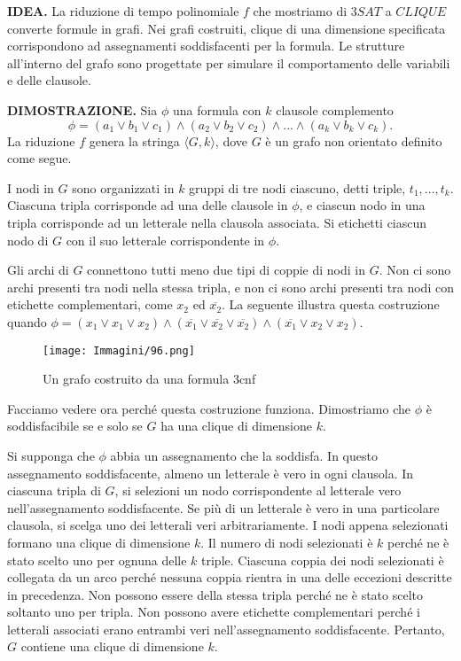 \documentclass{article}
\begin{document}
\text{}
\newline
\textbf{IDEA.}
La riduzione di tempo polinomiale $f$ che mostriamo di $3SAT$ a $CLIQUE$ converte formule in grafi. 
Nei grafi costruiti, clique di una dimensione specificata corrispondono ad assegnamenti soddisfacenti per la formula. 
Le strutture all'interno del grafo sono progettate per simulare il comportamento delle variabili e delle clausole.

\text{}
\newline
\textbf{DIMOSTRAZIONE.}
Sia $\phi$ una formula con $k$ clausole complemento
$$
\phi = (a_1 \lor b_1 \lor c_1) \land (a_2 \lor b_2 \lor c_2) \land ... \land (a_k \lor b_k \lor c_k).
$$
La riduzione $f$ genera la stringa $\langle G, k \rangle$, dove $G$ è un grafo non orientato definito come segue.

I nodi in $G$ sono organizzati in $k$ gruppi di tre nodi ciascuno, detti triple, $t_1,..., t_k$. 
Ciascuna tripla corrisponde ad una delle clausole in $\phi$, e ciascun nodo in una tripla corrisponde ad un letterale nella clausola associata. 
Si etichetti ciascun nodo di $G$ con il suo letterale corrispondente in $\phi$.

Gli archi di $G$ connettono tutti meno due tipi di coppie di nodi in $G$. 
Non
ci sono archi presenti tra nodi nella stessa tripla, e non ci sono archi presenti
tra nodi con etichette complementari, come $x_2$ ed $\overline{x_2}$. 
La seguente illustra questa costruzione quando $\phi = (x_1 \lor x_1 \lor x_2) \land (\overline{x_1} \lor \overline{x_2} \lor \overline{x_2}) \land (\overline{x_1} \lor x_2 \lor x_2)$.
\begin{figure}[H]
    \centering
    \texttt{[image: Immagini/96.png]}
    \caption{Un grafo costruito da una formula 3cnf}
    \label{fig:3cnf}
\end{figure}
Facciamo vedere ora perché questa costruzione funziona. 
Dimostriamo che $\phi$ è soddisfacibile se e solo se $G$ ha una clique di dimensione $k$.

Si supponga che $\phi$ abbia un assegnamento che la soddisfa.
In questo assegnamento soddisfacente, almeno un letterale è vero in ogni clausola.
In ciascuna tripla di $G$, si selezioni un nodo corrispondente al letterale vero nell'assegnamento soddisfacente. 
Se più di un letterale è vero in una particolare clausola, si scelga uno dei letterali veri arbitrariamente. 
I nodi appena selezionati formano una clique di dimensione $k$. 
Il numero di nodi selezionati è $k$ perché ne è stato scelto uno per ognuna delle $k$ triple.
Ciascuna coppia dei nodi selezionati è collegata da un arco perché nessuna coppia rientra in una delle eccezioni descritte in precedenza. 
Non possono essere della stessa tripla perché ne è stato scelto soltanto uno per tripla.
Non possono avere etichette complementari perché i letterali associati erano entrambi veri nell'assegnamento soddisfacente. 
Pertanto, $G$ contiene una clique di dimensione $k$.
\end{document}
